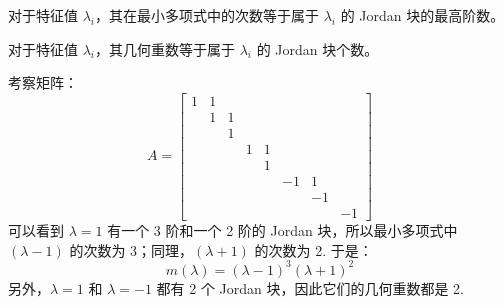\begin{theorem}
对于特征值 $\lambda_i$，其在最小多项式中的次数等于属于 $\lambda_i$ 的 Jordan 块的最高阶数。
\end{theorem}

\begin{theorem}
对于特征值 $\lambda_i$，其几何重数等于属于 $\lambda_i$ 的 Jordan 块个数。
\end{theorem}

\begin{example}
考察矩阵：
\[
    A=\begin{bmatrix}
    1&1&&&&&&\\
    &1&1&&&&&\\
    &&1&&&&&\\
    &&&1&1&&&\\
    &&&&1&&&\\
    &&&&&-1&1&\\
    &&&&&&-1&\\
    &&&&&&&-1
    \end{bmatrix}
\]
可以看到 $\lambda=1$ 有一个 3 阶和一个 2 阶的 Jordan 块，所以最小多项式中 $(\lambda-1)$ 的次数为 3；同理，$(\lambda+1)$ 的次数为 2. 于是：
\[
    m(\lambda)=(\lambda-1)^3(\lambda+1)^2
\]
另外，$\lambda=1$ 和 $\lambda=-1$ 都有 2 个 Jordan 块，因此它们的几何重数都是 2.
\end{example}

